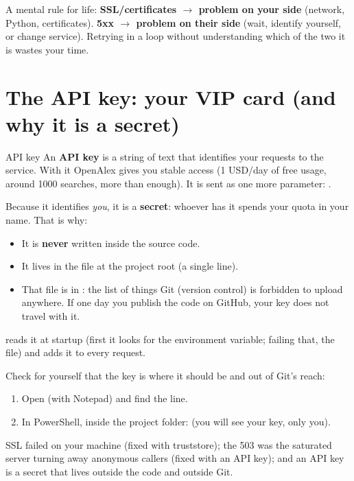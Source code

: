 \documentclass[11pt,a4paper]{article}
\begin{document}
\begin{ojo}
A mental rule for life: \textbf{SSL/certificates $\rightarrow$ problem on your side}
(network, Python, certificates). \textbf{5xx $\rightarrow$ problem on their side} (wait,
identify yourself, or change service). Retrying in a loop without understanding which of the
two it is wastes your time.
\end{ojo}

\section{The API key: your VIP card (and why it is a secret)}

\begin{concepto}{API key}
An \textbf{API key} is a string of text that identifies your requests to the service. With
it OpenAlex gives you stable access (1 USD/day of free usage, around 1000 searches, more than
enough). It is sent as one more parameter: .

Because it identifies \emph{you}, it is a \textbf{secret}: whoever has it spends your quota
in your name. That is why:
\begin{itemize}
  \item It is \textbf{never} written inside the source code.
  \item It lives in the  file at the project root (a single line).
  \item That file is in : the list of things Git (version control) is
        forbidden to upload anywhere. If one day you publish the code on GitHub, your key
        does not travel with it.
\end{itemize}
 reads it at startup (first it looks for the 
environment variable; failing that, the file) and  adds it to every request.
\end{concepto}

\begin{practica}
Check for yourself that the key is where it should be and out of Git's reach:
\begin{enumerate}
  \item Open  (with Notepad) and find the  line.
  \item In PowerShell, inside the project folder:
         \quad (you will see your key, only you).
\end{enumerate}
\end{practica}

\begin{resumen}
SSL failed on your machine (fixed with truststore); the 503 was the saturated server turning
away anonymous callers (fixed with an API key); and an API key is a secret that lives outside
the code and outside Git.
\end{resumen}
\end{document}
